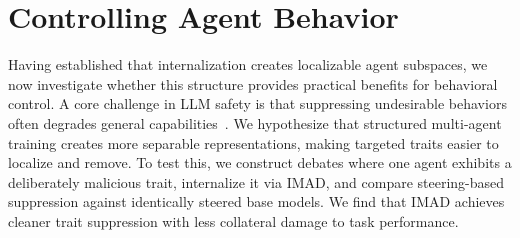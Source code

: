\documentclass[11pt]{article}
\begin{document}
\section{Controlling Agent Behavior} \label{sec:control}

Having established that internalization creates localizable agent subspaces, we now investigate whether this structure provides practical benefits for behavioral control. 
A core challenge in LLM safety is that suppressing undesirable behaviors often degrades general capabilities~\cite{lin2024mitigating, ravfogel2020null, ashuach2025crisp}. 
We hypothesize that structured multi-agent training creates more separable representations, making targeted traits easier to localize and remove. 
To test this, we construct debates where one agent exhibits a deliberately malicious trait, internalize it via IMAD, and compare steering-based suppression against identically steered base models. 
We find that IMAD achieves cleaner trait suppression with less collateral damage to task performance.
\end{document}
